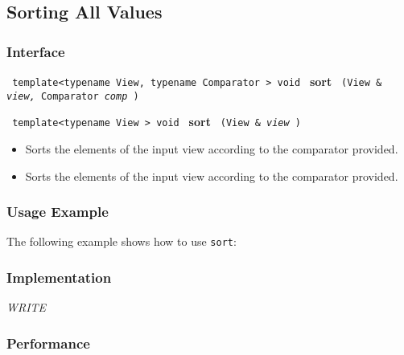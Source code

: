 
\subsection{Sorting All Values} \label{sec-sort-sort}

\subsubsection{Interface} %

\noindent
\texttt{%
template<typename View, typename Comparator >
\newline
void 
}
\newline
\textbf{sort}%
\texttt{%
(View \&
\textit{view,}%
Comparator 
\textit{comp}%
)
}
\vspace{0.4cm}

\noindent
\texttt{%
template<typename View >
\newline
void 
}
\newline
\textbf{sort}%
\texttt{%
(View \&
\textit{view}%
)
}

\begin{itemize}
\item
Sorts the elements of the input view according to the comparator provided. 
\item
Sorts the elements of the input view according to the comparator provided. 
\end{itemize}

\subsubsection{Usage Example} %

The following example shows how to use \texttt{sort}:

 
\subsubsection{Implementation} %

\textit{WRITE}

\subsubsection{Performance} %

